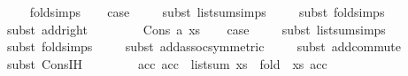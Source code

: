 \begin{isabellebody}
\ \ \isamarkupfalse%
\ fold{\isachardot}{\kern0pt}simps{\isacharparenleft}{\kern0pt}{}{\isacharparenright}{\kern0pt}\isanewline
\ \ \isamarkupfalse%
\ {\isacharquery}{\kern0pt}case\isanewline
\ \ \ \ \isamarkupfalse%
{\isacharparenleft}{\kern0pt}subst\ list{\isacharunderscore}{\kern0pt}sum{\isachardot}{\kern0pt}simps{\isacharparenleft}{\kern0pt}{}{\isacharparenright}{\kern0pt}{\isacharparenright}{\kern0pt}\isanewline
\ \ \ \ \isamarkupfalse%
{\isacharparenleft}{\kern0pt}subst\ fold{\isachardot}{\kern0pt}simps{\isacharparenleft}{\kern0pt}{}{\isacharparenright}{\kern0pt}{\isacharparenright}{\kern0pt}\isanewline
\ \ \ \ \isamarkupfalse%
{\isacharparenleft}{\kern0pt}subst\ add{\isacharunderscore}{\kern0pt}{}{\isacharunderscore}{\kern0pt}right{\isacharparenright}{\kern0pt}\isanewline
\ \ \ \ \isacommand{{\isachardot}{\kern0pt}{\isachardot}{\kern0pt}}\isamarkupfalse%
\isanewline
{}\isamarkupfalse%
\isanewline
\ \ \isamarkupfalse%
\ {\isacharparenleft}{\kern0pt}Cons\ a\ xs{\isacharparenright}{\kern0pt}\isanewline
\isanewline
\ \ \isamarkupfalse%
\ {\isacharquery}{\kern0pt}case\isanewline
\ \ \ \ \isamarkupfalse%
{\isacharparenleft}{\kern0pt}subst\ list{\isacharunderscore}{\kern0pt}sum{\isachardot}{\kern0pt}simps{\isacharparenleft}{\kern0pt}{}{\isacharparenright}{\kern0pt}{\isacharparenright}{\kern0pt}\isanewline
\ \ \ \ \isamarkupfalse%
{\isacharparenleft}{\kern0pt}subst\ fold{\isachardot}{\kern0pt}simps{\isacharparenleft}{\kern0pt}{}{\isacharparenright}{\kern0pt}{\isacharparenright}{\kern0pt}\isanewline
\ \ \ \ \isamarkupfalse%
{\isacharparenleft}{\kern0pt}subst\ add{\isachardot}{\kern0pt}assoc{\isacharbrackleft}{\kern0pt}symmetric{\isacharbrackright}{\kern0pt}{\isacharparenright}{\kern0pt}\isanewline
\ \ \ \ \isamarkupfalse%
{\isacharparenleft}{\kern0pt}subst\ add{\isachardot}{\kern0pt}commute{\isacharparenright}{\kern0pt}\isanewline
\ \ \ \ \isamarkupfalse%
{\isacharparenleft}{\kern0pt}subst\ Cons{\isachardot}{\kern0pt}IH{\isacharparenright}{\kern0pt}\isanewline
\ \ \ \ \isacommand{{\isachardot}{\kern0pt}{\isachardot}{\kern0pt}}\isamarkupfalse%
\ \ \isanewline
{}\isamarkupfalse%
%
\endisatagproof
{\isafoldproof}%
%
\isadelimproof
\isanewline
%
\endisadelimproof
\isanewline
{}\isamarkupfalse%
\ {\isachardoublequoteopen}{\isasymAnd}acc{\isachardot}{\kern0pt}\ acc\ {\isacharplus}{\kern0pt}\ list{\isacharunderscore}{\kern0pt}sum\ xs\ {\isacharequal}{\kern0pt}\ fold\ {\isacharparenleft}{\kern0pt}{\isacharplus}{\kern0pt}{\isacharparenright}{\kern0pt}\ xs\ acc{\isachardoublequoteclose}\isanewline

\end{isabellebody}
